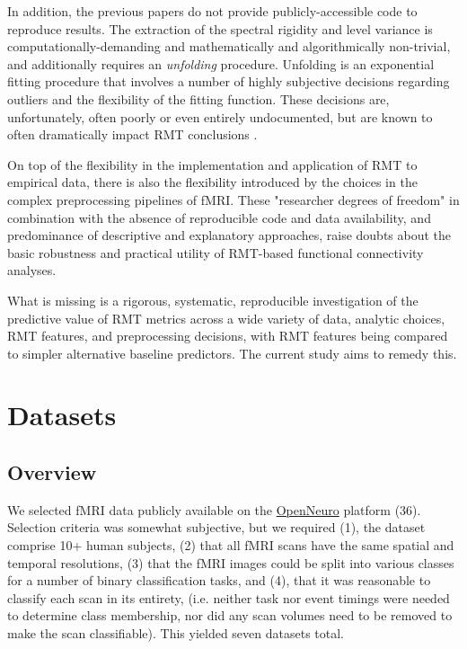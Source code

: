 \documentclass[12pt]{spieman}  %
\begin{document}
\begin{spacing}{2}
In addition, the previous papers do not provide publicly-accessible code to
reproduce results. The extraction of the spectral rigidity and level variance
is computationally-demanding and mathematically and algorithmically
non-trivial, and additionally requires an \textit{unfolding}
procedure\cite{guhrRandommatrixTheoriesQuantum1998a,mehtaRandomMatrices2004}.
Unfolding is an exponential fitting procedure that involves a number of highly
subjective decisions regarding outliers and the flexibility of the fitting
function. These decisions are, unfortunately, often poorly or even entirely
undocumented, but are known to often dramatically impact RMT conclusions
\cite{abul-magdUnfoldingSpectrumChaotic2014,
abueleninSpectralUnfoldingChaotic2018, fossionRandommatrixSpectraTime2013,
abueleninEffectUnfoldingSpectral2012, moralesImprovedUnfoldingDetrending2011}.

On top of the flexibility in the implementation and application of RMT to
empirical data, there is also the flexibility introduced by the choices in the
complex preprocessing pipelines of fMRI\cite{parkerBenefitSliceTiming2019}.
These "researcher degrees of
freedom"\cite{simmonsFalsePositivePsychologyUndisclosed2011b} in combination
with the absence of reproducible code and data availability, and predominance
of descriptive and explanatory approaches, raise doubts about the basic robustness
and practical utility of RMT-based functional connectivity analyses.

What is missing is a rigorous, systematic, reproducible investigation of the
predictive value of RMT metrics across a wide variety of data, analytic
choices, RMT features, and preprocessing decisions, with RMT features being
compared to simpler alternative baseline predictors. The current study aims to
remedy this.


\section{Datasets}
\label{sec:datasets}

\subsection{Overview}

We selected fMRI data publicly available on the
\href{https://openneuro.org/}{OpenNeuro} platform (36). Selection criteria was
somewhat subjective, but we required (1), the dataset comprise 10+ human
subjects, (2) that all fMRI scans have the same spatial and temporal
resolutions, (3) that the fMRI images could be split into various classes for a
number of binary classification tasks, and (4), that it was reasonable to
classify each scan in its entirety, (i.e. neither task nor event timings
were needed to determine class membership, nor did any scan volumes need to be removed
to make the scan classifiable). This yielded seven datasets total.



\end{spacing}
\end{document}
